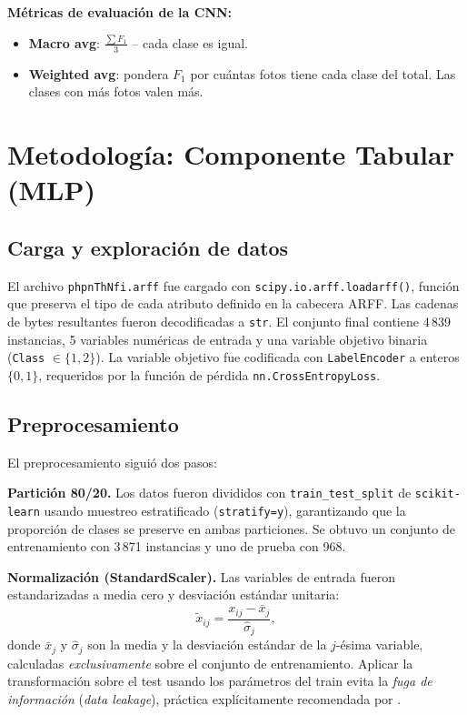 \documentclass[12pt, a4paper]{article}
\begin{document}
\textbf{Métricas de evaluación de la CNN:}
\begin{itemize}
  \item \textbf{Macro avg}: $\frac{\sum F_1}{3}$ -- cada clase es igual.
  \item \textbf{Weighted avg}: pondera $F_1$ por cuántas fotos tiene
    cada clase del total. Las clases con más fotos valen más.
\end{itemize}

\section{Metodología: Componente Tabular (MLP)}
\label{sec:metodo_tabular}

\subsection{Carga y exploración de datos}

El archivo \texttt{phpnThNfi.arff} fue cargado con
\texttt{scipy.io.arff.loadarff()}, función que preserva el tipo de
cada atributo definido en la cabecera ARFF. Las cadenas de bytes
resultantes fueron decodificadas a \texttt{str}. El conjunto final
contiene 4\,839 instancias, 5 variables numéricas de entrada y una
variable objetivo binaria (\texttt{Class} $\in \{1, 2\}$). La
variable objetivo fue codificada con \texttt{LabelEncoder} a enteros
$\{0, 1\}$, requeridos por la función de pérdida
\texttt{nn.\allowbreak CrossEntropyLoss}.

\subsection{Preprocesamiento}

El preprocesamiento siguió dos pasos:

\textbf{Partición 80/20.} Los datos fueron divididos con
\texttt{train\_test\_split} de \texttt{scikit-learn} usando muestreo
estratificado (\texttt{stratify=y}), garantizando que la proporción de
clases se preserve en ambas particiones. Se obtuvo un conjunto de
entrenamiento con 3\,871 instancias y uno de prueba con 968.

\textbf{Normalización (StandardScaler).} Las variables de entrada
fueron estandarizadas a media cero y desviación estándar unitaria:
\begin{equation}
  \tilde{x}_{ij} = \frac{x_{ij} - \bar{x}_j}{\hat{\sigma}_j},
  \label{eq:standardscaler}
\end{equation}
donde $\bar{x}_j$ y $\hat{\sigma}_j$ son la media y la desviación
estándar de la $j$-ésima variable, calculadas \emph{exclusivamente}
sobre el conjunto de entrenamiento. Aplicar la transformación sobre el
test usando los parámetros del train evita la \textit{fuga de
información} (\textit{data leakage}), práctica explícitamente
recomendada por \citet[Sec.~10.9.1]{islp2023}.
\end{document}
